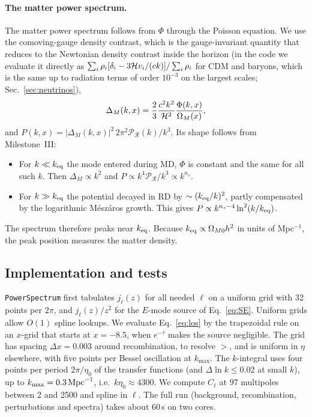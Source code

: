 \paragraph*{The matter power spectrum.} The matter power spectrum follows from $\Phi$ through the Poisson equation.
We use the comoving-gauge density contrast, which is the gauge-invariant quantity that reduces to the Newtonian density
contrast inside the horizon (in the code we evaluate it directly as
$\sum_i\rho_i[\delta_i-3\mathcal{H} v_i/(ck)]/\sum_i\rho_i$ for CDM and baryons, which is the same up to radiation terms of
order $10^{-3}$ on the largest scales; Sec.~\ref{sec:neutrinos}),
\begin{equation}
\Delta_M(k,x) = \frac{2}{3}\frac{c^2k^2}{\mathcal{H}^2}\frac{\Phi(k,x)}{\Omega_M(x)},
\label{eq:DeltaM}
\end{equation}
and $P(k,x)=|\Delta_M(k,x)|^2\,2\pi^2\mathcal{P}_{\mathcal{R}}(k)/k^3$. Its shape follows from Milestone~III:
\begin{itemize}
\item For $k\ll k_{\rm eq}$ the mode entered during MD, $\Phi$ is constant and the same for all such $k$. Then
      $\Delta_M\propto k^2$ and $P\propto k^4\mathcal{P}_{\mathcal{R}}/k^3\propto k^{n_s}$.
\item For $k\gg k_{\rm eq}$ the potential decayed in RD by $\sim(k_{\rm eq}/k)^2$, partly compensated by the
      logarithmic M\'esz\'aros growth. This gives $P\propto k^{n_s-4}\ln^2(k/k_{\rm eq})$.
\end{itemize}
The spectrum therefore peaks near $k_{\rm eq}$. Because $k_{\rm eq}\propto\Omega_{M0}h^2$ in units of Mpc$^{-1}$, the
peak position measures the matter density.

\subsection{Implementation and tests}

\texttt{PowerSpectrum} first tabulates $j_\ell(z)$ for all needed $\ell$ on a uniform grid with 32 points per
$2\pi$, and $j_\ell(z)/z^2$ for the $E$-mode source of Eq.~\eqref{eq:SE}. Uniform grids allow $O(1)$ spline lookups.
We evaluate Eq.~\eqref{eq:los} by the trapezoidal rule on an $x$-grid that starts at $x=-8.5$, when $e^{-\tau}$ makes
the source negligible. The grid has spacing $\Delta x=0.003$ around recombination, to resolve $\gt$, and is uniform in
$\eta$ elsewhere, with five points per Bessel oscillation at $k_{\max}$. The $k$-integral uses four points per period
$2\pi/\eta_0$ of the transfer functions (and $\Delta\ln k\le0.02$ at small $k$), up to $k_{\max}=0.3\,\mathrm{Mpc}^{-1}$, i.e.\
$k\eta_0\approx4300$. We compute $C_\ell$ at 97 multipoles between 2 and 2500 and spline in $\ell$. The full run
(background, recombination, perturbations and spectra) takes about 60\,s on two cores.

